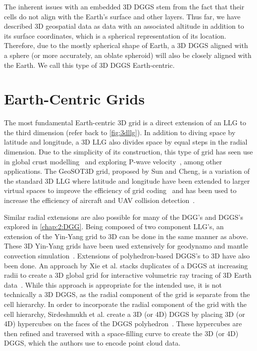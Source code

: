The inherent issues with an embedded 3D DGGS stem from the fact that their cells do not align with the Earth's surface and other layers.
Thus far, we have described 3D geospatial data as data with an associated altitude in addition to its surface coordinates, which is a spherical representation of its location.
Therefore, due to the mostly spherical shape of Earth, a 3D DGGS aligned with a sphere (or more accurately, an oblate spheroid) will also be closely aligned with the Earth.
We call this type of 3D DGGS Earth-centric.


\section{Earth-Centric Grids} \label{chap:3:earthCentric}
The most fundamental Earth-centric 3D grid is a direct extension of an LLG to the third dimension (refer back to \cref{fig:3dllg}).
In addition to diving space by latitude and longitude, a 3D LLG also divides space by equal steps in the radial dimension.
Due to the simplicity of its construction, this type of grid has seen use in global crust modelling~\cite{bassin2000current} and exploring P-wave velocity~\cite{zhao2004global}, among other applications.
The GeoSOT3D grid, proposed by Sun and Cheng, is a variation of the standard 3D LLG where latitude and longitude have been extended to larger virtual spaces to improve the efficiency of grid coding~\cite{sun20153d} and has been used to increase the efficiency of aircraft and UAV collision detection~\cite{miao2019low, zhai2019collision}.


Similar radial extensions are also possible for many of the DGG's and DGGS's explored in \cref{chap:2:DGG}.
Being composed of two component LLG's, an extension of the Yin-Yang grid to 3D can be done in the same manner as above.
These 3D Yin-Yang grids have been used extensively for geodynamo and mantle convection simulation~\cite{yoshida2004application, kageyama2005geodynamo, tackley2008modelling}.
Extensions of polyhedron-based DGGS's to 3D have also been done.
An approach by Xie et al. stacks duplicates of a DGGS at increasing radii to create a 3D global grid for interactive volumetric ray tracing of 3D Earth data~\cite{xie2013interactive}.
While this approach is appropriate for the intended use, it is not technically a 3D DGGS, as the radial component of the grid is separate from the cell hierarchy.
In order to incorporate the radial component of the grid with the cell hierarchy, Sirdeshmukh et al. create a 3D (or 4D) DGGS by placing 3D (or 4D) hypercubes on the faces of the DGGS polyhedron~\cite{sirdeshmukh2019utilizing}.
These hypercubes are then refined and traversed with a space-filling curve to create the 3D (or 4D) DGGS, which the authors use to encode point cloud data.


